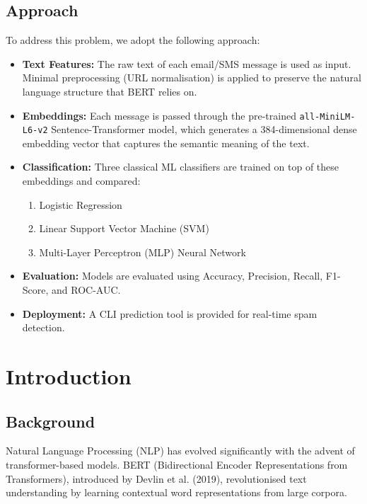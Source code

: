 \documentclass[12pt,a4paper]{article}
\begin{document}
\subsection{Approach}
To address this problem, we adopt the following approach:
\begin{itemize}[leftmargin=1.5cm]
    \item \textbf{Text Features:} The raw text of each email/SMS message is used as input. Minimal preprocessing (URL normalisation) is applied to preserve the natural language structure that BERT relies on.
    \item \textbf{Embeddings:} Each message is passed through the pre-trained \texttt{all-MiniLM-L6-v2} Sentence-Transformer model, which generates a 384-dimensional dense embedding vector that captures the semantic meaning of the text.
    \item \textbf{Classification:} Three classical ML classifiers are trained on top of these embeddings and compared:
    \begin{enumerate}
        \item Logistic Regression
        \item Linear Support Vector Machine (SVM)
        \item Multi-Layer Perceptron (MLP) Neural Network
    \end{enumerate}
    \item \textbf{Evaluation:} Models are evaluated using Accuracy, Precision, Recall, F1-Score, and ROC-AUC.
    \item \textbf{Deployment:} A CLI prediction tool is provided for real-time spam detection.
\end{itemize}

\section{Introduction}

\subsection{Background}
Natural Language Processing (NLP) has evolved significantly with the advent of transformer-based models. BERT (Bidirectional Encoder Representations from Transformers), introduced by Devlin et al. (2019), revolutionised text understanding by learning contextual word representations from large corpora.
\end{document}
